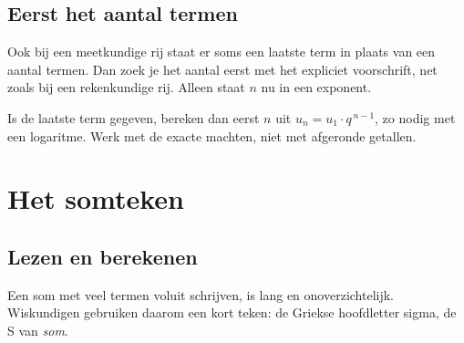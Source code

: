\subsection{Eerst het aantal termen}

Ook bij een meetkundige rij staat er soms een laatste term in plaats van een aantal termen. Dan zoek je het aantal eerst met het expliciet voorschrift, net zoals bij een rekenkundige rij. Alleen staat $n$ nu in een exponent.


\begin{werkwijze}
Is de laatste term gegeven, bereken dan eerst $n$ uit $u_n = u_1 \cdot q^{\,n-1}$, zo nodig met een logaritme. Werk met de exacte machten, niet met afgeronde getallen.
\end{werkwijze}


\begin{oefeningen}
\end{oefeningen}

\section{Het somteken}

\subsection{Lezen en berekenen}

Een som met veel termen voluit schrijven, is lang en onoverzichtelijk. Wiskundigen gebruiken daarom een kort teken: de Griekse hoofdletter sigma, de S van \textit{som}.

